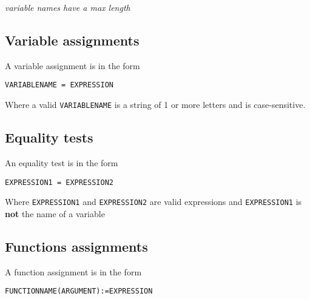 \documentclass[11pt,a4paper]{article}
\begin{document}
\emph{variable names have a max length}


\subsection{Variable assignments}
A variable assignment is in the form

\texttt{VARIABLENAME = EXPRESSION}

Where a valid \texttt{VARIABLENAME} is a string of 1 or more letters and
is case-sensitive.
\subsection{Equality tests}
An equality test is in the form

\texttt{EXPRESSION1 = EXPRESSION2}

Where \texttt{EXPRESSION1} and \texttt{EXPRESSION2} are valid expressions and
\texttt{EXPRESSION1} is \textbf{not} the name of a variable

\subsection{Functions assignments}
A function assignment is in the form

\texttt{FUNCTIONNAME(ARGUMENT):=EXPRESSION}
\end{document}

